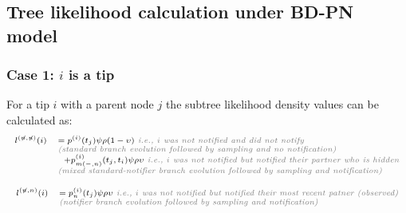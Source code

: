 \documentclass[10pt,letterpaper]{article}
\begin{document}
\subsection*{Tree likelihood calculation under BD-PN model}

\subsubsection*{Case 1: $i$ is a tip} 

For a tip $i$ with a parent node $j$ the subtree likelihood density values can be calculated as:
\begin{equation}
\scriptsize
\begin{array}{ll}
l^{(\not{n},\not{n})}(i) &= p^{(i)}(t_j)\psi\rho (1-\upsilon) \textit{\color{gray} ~i.e., $i$ was not notified and did not notify}\\
& \textit{\color{gray} (standard branch evolution followed by sampling and no notification)}\\
&~~+p_{m(-,n)}^{(i)}(t_j,t_i)\psi\rho\upsilon \textit{\color{gray} ~i.e., $i$ was not notified but notified their partner who is hidden}\\
& \textit{\color{gray} (mixed standard-notifier branch evolution followed by sampling and notification)}
\end{array}
\label{eq:tipxx}
\end{equation}

\begin{equation}
\scriptsize
\begin{array}{ll}
l^{(\not{n},n)}(i) &= p_n^{(i)}(t_j)\psi\rho
\upsilon \textit{\color{gray} ~i.e., $i$ was not notified but notified their most recent patner (observed)}\\
& \textit{\color{gray} (notifier branch evolution followed by sampling and notification)}
\end{array}
\label{eq:tipxx}
\end{equation}
\end{document}
